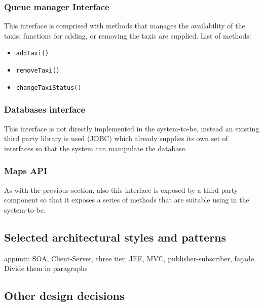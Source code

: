 \subsubsection{Queue manager Interface}
This interface is comprised with methods that manages the availability of the taxis, functions for adding, or removing the taxis are supplied. \newline
List of methods:
\begin{itemize}
	\item \texttt{addTaxi()}
	\item \texttt{removeTaxi()}
	\item \texttt{changeTaxiStatus()}
\end{itemize}
\subsubsection{Databases interface}
This interface is not directly implemented in the system-to-be, instead an existing third party library is used (JDBC) which already supplies its own set of interfaces so that the system can manipulate the database.
\subsubsection{Maps API}
As with the previous section, also this interface is exposed by a third party component so that it exposes a series of methods that are suitable using in the system-to-be.
\subsection{Selected architectural styles and patterns}
\label{sec:arch-styles-patterns}
appunti: SOA, Client-Server, three tier, JEE, MVC, publisher-subscriber, façade. Divide them in paragraphs
\subsection{Other design decisions}